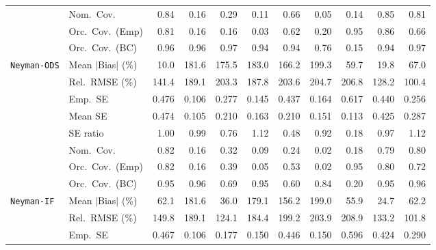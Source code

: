 \begin{landscape}
\begin{longtable}{llrrrrrrrrr}
 & Nom.\ Cov. & \cellcolor{ranktwo}0.84 & 0.16 & 0.29 & 0.11 & 0.66 & 0.05 & 0.14 & \cellcolor{rankone}0.85 & \cellcolor{rankthree}0.81 \\
 & Orc.\ Cov.\ (Emp) & \cellcolor{rankthree}0.81 & 0.16 & 0.16 & 0.03 & 0.62 & 0.20 & \cellcolor{rankone}0.95 & \cellcolor{ranktwo}0.86 & 0.66 \\
 & Orc.\ Cov.\ (BC) & \cellcolor{rankone}0.96 & \cellcolor{rankone}0.96 & \cellcolor{ranktwo}0.97 & \cellcolor{rankone}0.94 & \cellcolor{rankone}0.94 & \cellcolor{rankthree}0.76 & 0.15 & \cellcolor{rankone}0.94 & \cellcolor{ranktwo}0.97 \\
\addlinespace[2pt]
\quad \texttt{Neyman-ODS} & Mean $|$Bias$|$ (\%) & \cellcolor{rankone}10.0 & 181.6 & 175.5 & 183.0 & 166.2 & 199.3 & \cellcolor{rankthree}59.7 & \cellcolor{ranktwo}19.8 & 67.0 \\
 & Rel.\ RMSE (\%) & \cellcolor{rankthree}141.4 & 189.1 & 203.3 & 187.8 & 203.6 & 204.7 & 206.8 & \cellcolor{ranktwo}128.2 & \cellcolor{rankone}100.4 \\
 & Emp.\ SE & 0.476 & 0.106 & 0.277 & 0.145 & 0.437 & 0.164 & 0.617 & 0.440 & 0.256 \\
 & Mean SE & 0.474 & 0.105 & 0.210 & 0.163 & 0.210 & 0.151 & 0.113 & 0.425 & 0.287 \\
 & SE ratio & \cellcolor{rankone}1.00 & \cellcolor{ranktwo}0.99 & 0.76 & 1.12 & 0.48 & 0.92 & 0.18 & \cellcolor{rankthree}0.97 & 1.12 \\
 & Nom.\ Cov. & \cellcolor{rankone}0.82 & 0.16 & 0.32 & 0.09 & 0.24 & 0.02 & 0.18 & \cellcolor{rankthree}0.79 & \cellcolor{ranktwo}0.80 \\
 & Orc.\ Cov.\ (Emp) & \cellcolor{ranktwo}0.82 & 0.16 & 0.39 & 0.05 & 0.53 & 0.02 & \cellcolor{rankone}0.95 & \cellcolor{rankthree}0.80 & 0.72 \\
 & Orc.\ Cov.\ (BC) & \cellcolor{ranktwo}0.95 & \cellcolor{ranktwo}0.96 & 0.69 & \cellcolor{rankone}0.95 & 0.60 & \cellcolor{rankthree}0.84 & 0.20 & \cellcolor{rankone}0.95 & \cellcolor{ranktwo}0.96 \\
\addlinespace[2pt]
\quad \texttt{Neyman-IF} & Mean $|$Bias$|$ (\%) & 62.1 & 181.6 & \cellcolor{ranktwo}36.0 & 179.1 & 156.2 & 199.0 & \cellcolor{rankthree}55.9 & \cellcolor{rankone}24.7 & 62.2 \\
 & Rel.\ RMSE (\%) & 149.8 & 189.1 & \cellcolor{ranktwo}124.1 & 184.4 & 199.2 & 203.9 & 208.9 & \cellcolor{rankthree}133.2 & \cellcolor{rankone}101.8 \\
 & Emp.\ SE & 0.467 & 0.106 & 0.177 & 0.150 & 0.446 & 0.150 & 0.596 & 0.424 & 0.290 \\

\end{longtable}
\end{landscape}

